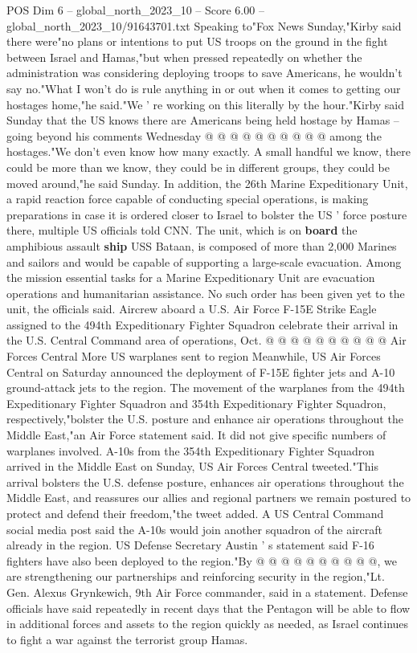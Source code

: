 \begin{textsample}{POS Dim 6 – global\_north\_2023\_10 – Score 6.00 – global\_north\_2023\_10/91643701.txt}
Speaking to"Fox News Sunday,"Kirby said there were"no plans or intentions to put US troops on the ground in the fight between Israel and Hamas,"but when pressed repeatedly on whether the administration was considering deploying troops to save Americans, he wouldn't say no."What I won't do is rule anything in or out when it comes to getting our hostages home,"he said."We ' re working on this literally by the hour."Kirby said Sunday that the US knows there are Americans being held hostage by Hamas -- going beyond his comments Wednesday @ @ @ @ @ @ @ @ @ @ among the hostages."We don't even know how many exactly.
A small handful we know, there could be more than we know, they could be in different groups, they could be moved around,"he said Sunday.
In addition, the 26th Marine Expeditionary Unit, a rapid reaction force capable of conducting special operations, is making preparations in case it is ordered closer to Israel to bolster the US ' force posture there, multiple US officials told CNN.
The unit, which is on \textbf{board} the amphibious assault \textbf{ship} USS Bataan, is composed of more than 2,000 Marines and sailors and would be capable of supporting a large-scale evacuation.
Among the mission essential tasks for a Marine Expeditionary Unit are evacuation operations and humanitarian assistance.
No such order has been given yet to the unit, the officials said.
Aircrew aboard a U.S.
Air Force F-15E Strike Eagle assigned to the 494th Expeditionary Fighter Squadron celebrate their arrival in the U.S.
Central Command area of operations, Oct. @ @ @ @ @ @ @ @ @ @ Air Forces Central More US warplanes sent to region Meanwhile, US Air Forces Central on Saturday announced the deployment of F-15E fighter jets and A-10 ground-attack jets to the region.
The movement of the warplanes from the 494th Expeditionary Fighter Squadron and 354th Expeditionary Fighter Squadron, respectively,"bolster the U.S. posture and enhance air operations throughout the Middle East,"an Air Force statement said.
It did not give specific numbers of warplanes involved.
A-10s from the 354th Expeditionary Fighter Squadron arrived in the Middle East on Sunday, US Air Forces Central tweeted."This arrival bolsters the U.S. defense posture, enhances air operations throughout the Middle East, and reassures our allies and regional partners we remain postured to protect and defend their freedom,"the tweet added.
A US Central Command social media post said the A-10s would join another squadron of the aircraft already in the region.
US Defense Secretary Austin ' s statement said F-16 fighters have also been deployed to the region."By @ @ @ @ @ @ @ @ @ @, we are strengthening our partnerships and reinforcing security in the region,"Lt.
Gen.
Alexus Grynkewich, 9th Air Force commander, said in a statement.
Defense officials have said repeatedly in recent days that the Pentagon will be able to flow in additional forces and assets to the region quickly as needed, as Israel continues to fight a war against the terrorist group Hamas.

\end{textsample}
